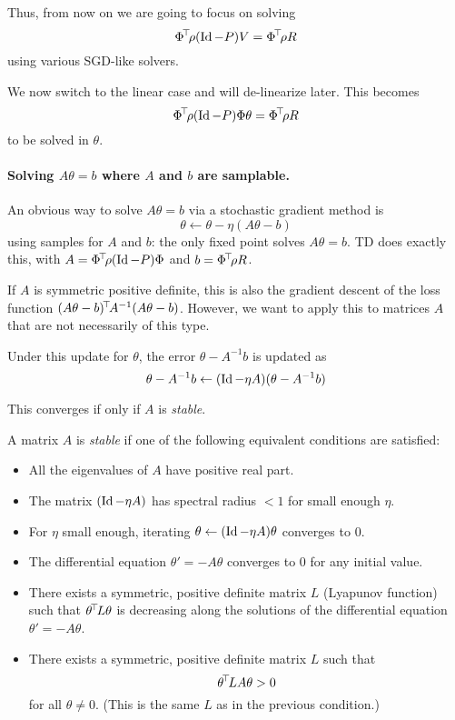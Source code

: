 \documentclass[11pt,a4paper]{article}
\begin{document}
Thus, from now on we are going to focus on solving
\begin{equation}
\Phi^{\!\top}\!\rho (\operatorname{Id}-P)V=\Phi^{\!\top}\!\rho R
\end{equation}
using various SGD-like solvers.

We now switch to the linear case and will de-linearize later. This
becomes
\begin{equation}
\Phi^{\!\top}\!\rho (\operatorname{Id}-P)\Phi \theta=\Phi^{\!\top}\!\rho R
\end{equation}
to be solved in $\theta$.

\paragraph{Solving $A\theta=b$ where $A$ and $b$ are samplable.} An
obvious way to solve $A\theta=b$ via a stochastic gradient method is
\begin{equation}
\theta\gets \theta - \eta (A\theta-b)
\end{equation}
using samples for $A$ and $b$: the only fixed point solves $A\theta=b$.
TD does exactly this, 
with $A=\Phi^{\!\top}\!\rho(\operatorname{Id}-P)\Phi$ and $b=\Phi^{\!\top}\!\rho R$.

If $A$ is symmetric positive definite, this is also the
gradient descent of the loss function
$(A\theta-b)^{\!\top}\!A^{-1}(A\theta-b)$. However, we want to apply this
to matrices $A$ that are not necessarily of this type.

Under this update for $\theta$, the error $\theta-A^{-1}b$ is updated as
\begin{equation}
\theta-A^{-1}b \gets (\operatorname{Id}-\eta A)(\theta-A^{-1}b)
\end{equation}

This converges if only if $A$ is \emph{stable}.


\begin{defi}
A matrix $A$ is \emph{stable} if one of the following equivalent
conditions are satisfied:
\begin{itemize}
\item All the eigenvalues of $A$ have positive real part.
\item The matrix $(\operatorname{Id}-\eta A)$ has spectral radius $<1$ for small enough
$\eta$.
\item For $\eta$ small enough, iterating $\theta\gets (\operatorname{Id}-\eta A)\theta$
converges to $0$.
\item The differential equation $\theta'=-A\theta$ converges to $0$ for
any initial value.
\item There exists a symmetric, positive definite matrix $L$ (Lyapunov
function) such that $\theta^{\!\top}\!L\theta$ is decreasing along the
solutions of the differential equation $\theta'=-A\theta$.
\item There exists a symmetric, positive definite matrix $L$ such that
\begin{equation}
\theta^{\!\top}\! L A \theta>0
\end{equation}
for all $\theta\neq 0$. (This is the same $L$ as in the previous
condition.)
\end{itemize}
\end{defi}
\end{document}

